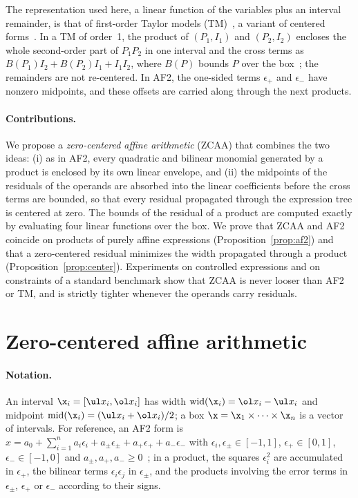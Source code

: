 \documentclass[10pt]{article}
\newcommand{\midp}{\mathrm{mid}}
\renewcommand{\wid}{\mathrm{wid}}
\begin{document}
The representation used here, a linear function of the variables plus an interval remainder, is that of first-order Taylor models (TM)~\cite{makino2003}, a variant of centered forms~\cite{neumaier2003taylor}. In a TM of order~1, the product of $(P_1, I_1)$ and $(P_2, I_2)$ encloses the whole second-order part of $P_1P_2$ in one interval and the cross terms as $B(P_1) I_2 + B(P_2) I_1 + I_1 I_2$, where $B(P)$ bounds $P$ over the box~\cite[Def.~2]{makino2003}; the remainders are not re-centered. In AF2, the one-sided terms $\epsilon_+$ and $\epsilon_-$ have nonzero midpoints, and these offsets are carried along through the next products.

\paragraph{Contributions.} We propose a \emph{zero-centered affine arithmetic} (ZCAA) that combines the two ideas: (i) as in AF2, every quadratic and bilinear monomial generated by a product is enclosed by its own linear envelope, and (ii) the midpoints of the residuals of the operands are absorbed into the linear coefficients before the cross terms are bounded, so that every residual propagated through the expression tree is centered at zero. The bounds of the residual of a product are computed exactly by evaluating four linear functions over the box. We prove that ZCAA and AF2 coincide on products of purely affine expressions (Proposition~\ref{prop:af2}) and that a zero-centered residual minimizes the width propagated through a product (Proposition~\ref{prop:center}). Experiments on controlled expressions and on constraints of a standard benchmark show that ZCAA is never looser than AF2 or TM, and is strictly tighter whenever the operands carry residuals.

\section{Zero-centered affine arithmetic}
\label{sec:zcaa}

\paragraph{Notation.} An interval $\x_i=[\ul x_i,\ol x_i]$ has width $\wid(\x_i)=\ol x_i-\ul x_i$ and midpoint $\midp(\x_i)=(\ul x_i+\ol x_i)/2$; a box $\x=\x_1\times\dots\times\x_n$ is a vector of intervals. For reference, an AF2 form is $\hat x=a_0+\sum_{i=1}^n a_i\epsilon_i+a_\pm\epsilon_\pm+a_+\epsilon_++a_-\epsilon_-$ with $\epsilon_i,\epsilon_\pm\in[-1,1]$, $\epsilon_+\in[0,1]$, $\epsilon_-\in[-1,0]$ and $a_\pm,a_+,a_-\ge 0$~\cite{messine2002extentions}; in a product, the squares $\epsilon_i^2$ are accumulated in $\epsilon_+$, the bilinear terms $\epsilon_i\epsilon_j$ in $\epsilon_\pm$, and the products involving the error terms in $\epsilon_\pm$, $\epsilon_+$ or $\epsilon_-$ according to their signs.
\end{document}
